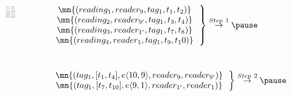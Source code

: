 \begin{frame}
\begin{columns}[c]
\vspace{-15pt}
\begin{figure}[tb]
  \includegraphics[width=\columnwidth]{figures/2-1/2-1-12.pdf}
\end{figure}
\tiny{
  \pause
  $\left.\begin{matrix}
  \mn{(reading_1, reader_{9}, tag_1, t_1, t_2)}~~\\
  \mn{(reading_2, reader_{9'}, tag_1, t_3, t_4)}~~\\
  \mn{(reading_3, reader_{1'}, tag_1, t_7, t_8)}~~\\
  \mn{(reading_4, reader_{1}, tag_1, t_9, t_10)}~~
  \end{matrix}\right\} \overset{Step~1}{\rightarrow} \pause$ \\~\\~\\

  $\left.\begin{matrix}
  \mn{(tag_1, [t_1,t_4], e\langle 10,9 \rangle, reader_{9}, reader_{9'})}~~\\
  \mn{(tag_1, [t_7,t_{10}], e\langle 9,1 \rangle, reader_{1'}, reader_{1})}~~
  \end{matrix}\right\} \overset{Step~2}{\rightarrow} \pause$ \\~\\~\\

}
\end{columns}
\end{frame}
